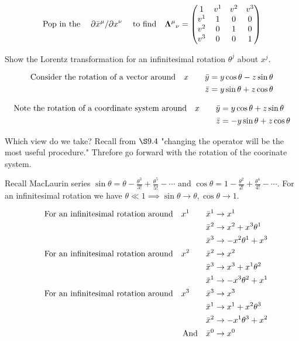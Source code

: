 \documentclass{article}
\begin{document}
\[ \qq*{Pop in the}\pdv*{\bar{x}^\mu}{x^\nu}\qq{to find}{\vb{\Lambda}^\mu}_\nu=\begin{pmatrix}1 & v^1 & v^2 & v^3 \\v^1&1&0&0\\v^2&0&1&0\\v^3&0&0&1\\
	\end{pmatrix}\]

Show the Lorentz transformation for an infinitesimal rotation $\theta^j$ about $x^j$. 

\begin{align*}
	\qq*{Consider the rotation of a vector around}x\qquad
	\bar{y} & =y\cos\theta-z\sin\theta \\
	\bar{z} & =y\sin\theta+z\cos\theta
\end{align*}

\begin{align*}
	\qq*{Note the rotation of a coordinate system around}x\qquad
	\bar{y} & =y\cos\theta+z\sin\theta  \\
	\bar{z} & =-y\sin\theta+z\cos\theta
\end{align*}

Which view do we take? Recall from $\S9.4$ "changing the operator will be the most useful procedure." Threfore go forward with the rotation of the coorinate system.

Recall MacLaurin series $\sin\theta=\theta-\frac{\theta^3}{3!}+\frac{\theta^5}{5!}-\cdots$ and $\cos\theta=1-\frac{\theta^2}{2!}+\frac{\theta^4}{4!}-\cdots$.
For an infinitesimal rotation we have $\theta\ll1\implies \sin\theta\to\theta, \cos\theta\to 1$.

\begin{align*}
	\qq{For an infinitesimal rotation around}x^1\qquad \bar{x}^1 & \to x^1                \\
	\bar{x}^2                                                    & \to x^2 +x^3 \theta^1  \\
	\bar{x}^3                                                    & \to -x^2 \theta^1 +x^3 \\
	\qq{For an infinitesimal rotation around}x^2\qquad \bar{x}^2 & \to x^2                \\
	\bar{x}^3                                                    & \to x^3 +x^1 \theta^2  \\
	\bar{x}^1                                                    & \to -x^3 \theta^2 +x^1 \\
	\qq{For an infinitesimal rotation around}x^3\qquad \bar{x}^3 & \to x^3                \\
	\bar{x}^1                                                    & \to x^1 +x^2 \theta^3  \\
	\bar{x}^2                                                    & \to -x^1 \theta^3 +x^2 \\
	\qq{And} \bar{x}^0                                           & \to x^0                \\
\end{align*}
\end{document}
